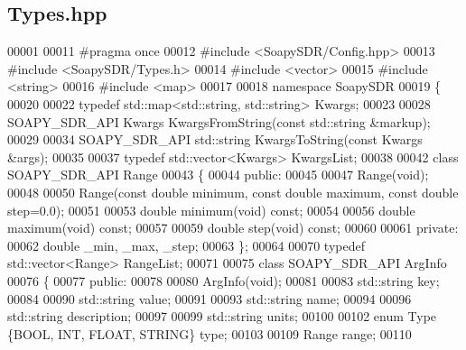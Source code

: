 \subsection{Types.\+hpp}
\label{Types_8hpp_source}

\begin{DoxyCode}
00001 
00011 \textcolor{preprocessor}{#pragma once}
00012 \textcolor{preprocessor}{#include <SoapySDR/Config.hpp>}
00013 \textcolor{preprocessor}{#include <SoapySDR/Types.h>}
00014 \textcolor{preprocessor}{#include <vector>}
00015 \textcolor{preprocessor}{#include <string>}
00016 \textcolor{preprocessor}{#include <map>}
00017 
00018 \textcolor{keyword}{namespace }SoapySDR
00019 \{
00020 
00022 \textcolor{keyword}{typedef} std::map<std::string, std::string> Kwargs;
00023 
00028 SOAPY_SDR_API Kwargs KwargsFromString(\textcolor{keyword}{const} std::string &markup);
00029 
00034 SOAPY_SDR_API std::string KwargsToString(\textcolor{keyword}{const} Kwargs &args);
00035 
00037 \textcolor{keyword}{typedef} std::vector<Kwargs> KwargsList;
00038 
00042 \textcolor{keyword}{class }SOAPY_SDR_API Range
00043 \{
00044 \textcolor{keyword}{public}:
00045 
00047     Range(\textcolor{keywordtype}{void});
00048 
00050     Range(\textcolor{keyword}{const} \textcolor{keywordtype}{double} minimum, \textcolor{keyword}{const} \textcolor{keywordtype}{double} maximum, \textcolor{keyword}{const} \textcolor{keywordtype}{double} step=0.0);
00051 
00053     \textcolor{keywordtype}{double} minimum(\textcolor{keywordtype}{void}) \textcolor{keyword}{const};
00054 
00056     \textcolor{keywordtype}{double} maximum(\textcolor{keywordtype}{void}) \textcolor{keyword}{const};
00057 
00059     \textcolor{keywordtype}{double} step(\textcolor{keywordtype}{void}) \textcolor{keyword}{const};
00060 
00061 \textcolor{keyword}{private}:
00062     \textcolor{keywordtype}{double} \_min, \_max, _step;
00063 \};
00064 
00070 \textcolor{keyword}{typedef} std::vector<Range> RangeList;
00071 
00075 \textcolor{keyword}{class }SOAPY_SDR_API ArgInfo
00076 \{
00077 \textcolor{keyword}{public}:
00078 
00080     ArgInfo(\textcolor{keywordtype}{void});
00081 
00083     std::string key;
00084 
00090     std::string value;
00091 
00093     std::string name;
00094 
00096     std::string description;
00097 
00099     std::string units;
00100 
00102     \textcolor{keyword}{enum} Type \{BOOL, INT, FLOAT, STRING\} type;
00103 
00109     Range range;
00110 

\end{DoxyCode}
